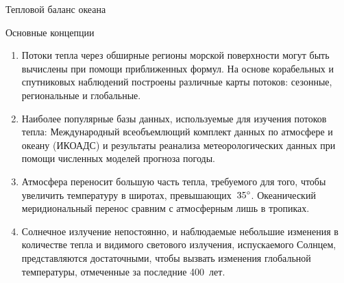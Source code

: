 \begin{chapter}{Тепловой баланс океана}
\begin{section}{Основные концепции}
\begin{enumerate}
\item
Потоки тепла через обширные регионы морской поверхности могут быть вычислены
при помощи приближенных формул. На основе корабельных и спутниковых наблюдений 
построены различные карты потоков: сезонные, региональные и глобальные.
%

\item
Наиболее популярные базы данных, используемые для изучения потоков тепла:
Международный всеобъемлющий комплект данных по атмосфере и океану (ИКОАДС)
и результаты реанализа метеорологических данных при помощи численных моделей
прогноза погоды.
%

\item
Атмосфера переносит большую часть тепла, требуемого для того, чтобы увеличить
температуру в широтах, превышающих~${35}^\circ$. Океанический меридиональный
перенос сравним с атмосферным лишь в тропиках.
%

\item
Солнечное излучение непостоянно, и наблюдаемые небольшие изменения в
количестве тепла и видимого светового излучения, испускаемого Солнцем,
представляются достаточными, чтобы вызвать изменения глобальной температуры,
отмеченные за последние 400~лет.
%
%
\end{enumerate}
\end{section}

\end{chapter}